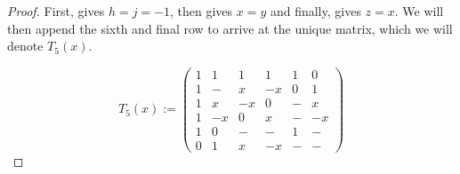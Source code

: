 \begin{lemma}
\begin{proof}
First,  gives $h = j = -1$, then  gives $x = y$ and finally,  gives $z = x$. We will then append the sixth and final row to arrive at the unique matrix, which we will denote $T_5(x)$.

\begin{equation} \label{mat:t5}
T_5(x) := \left(\begin{array}{rrrrrr}
               1 & 1  & 1  &  1 &  1 & 0 \\
               1 & -  & x  & -x &  0 & 1 \\
               1 & x  & -x &  0 &  - & x \\
               1 & -x & 0  &  x &  - & -x \\
               1 & 0  & -  &  - &  1 & - \\
	       0 & 1  & x  & -x &  - & -
             \end{array}\right)
\end{equation}

 \end{proof}

\end{lemma}
